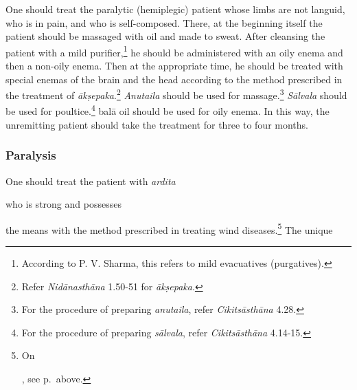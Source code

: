 \begin{translation}
\begin{tt}
        One should treat the paralytic (hemiplegic) patient whose
        limbs are not languid, who is in pain, and who is self-composed. There, at the
        beginning itself the patient should be massaged with oil and made to sweat.
        After cleansing the patient with a mild purifier,\footnote{According to P. V.
            Sharma, this refers to mild evacuatives (purgatives).} he should be
        administered with an oily enema and then a non-oily enema. Then at the
        appropriate time, he should be treated with special enemas of the brain and the
        head according to the method prescribed in the treatment of
        \textit{ākṣepaka}.\footnote{Refer \textit{Nidānasthāna} 1.50-51 for
            \textit{ākṣepaka}.} \textit{Anutaila} should be used for
        massage.\footnote{For the procedure of preparing \textit{anutaila}, refer
            \textit{Cikitsāsthāna} 4.28.} \textit{Sālvala} should be used for
        poultice.\footnote{For the procedure of preparing \textit{sālvala}, refer
            \textit{Cikitsāsthāna} 4.14-15.} \gls{balā} oil should be used for oily
        enema. In this way, the unremitting
        patient should take the treatment for three to four months.



        \item[20]



        \item[21]



        \subsubsection{Paralysis}

        \item[22]

        One should treat the patient with \textit{ardita}



        who is strong and possesses

        the means with the method prescribed in
        treating wind diseases.\footnote{On

            , see
            p.\,\pageref{ardita} above.} The unique


\end{tt}
\end{translation}
